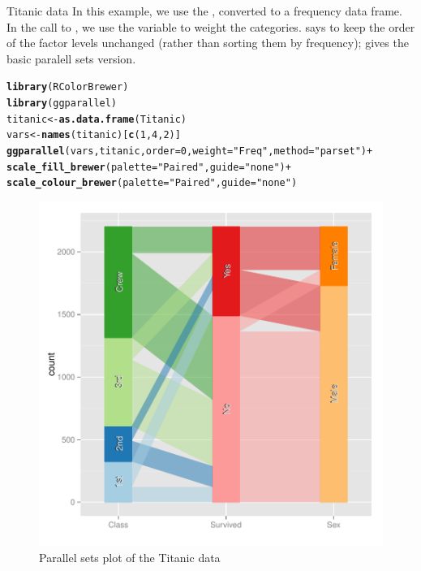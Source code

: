 \documentclass[11pt]{book}\usepackage[]{graphicx}\usepackage[]{color}
\makeatletter
\newcommand{\hlnum}[1]{\textcolor[rgb]{0.686,0.059,0.569}{#1}}%
\newcommand{\hlstr}[1]{\textcolor[rgb]{0.192,0.494,0.8}{#1}}%
\newcommand{\hlopt}[1]{\textcolor[rgb]{0,0,0}{#1}}%
\newcommand{\hlstd}[1]{\textcolor[rgb]{0.345,0.345,0.345}{#1}}%
\newcommand{\hlkwb}[1]{\textcolor[rgb]{0.69,0.353,0.396}{#1}}%
\newcommand{\hlkwc}[1]{\textcolor[rgb]{0.333,0.667,0.333}{#1}}%
\newcommand{\hlkwd}[1]{\textcolor[rgb]{0.737,0.353,0.396}{\textbf{#1}}}%
\newenvironment{kframe}{%
 \def\at@end@of@kframe{}%
 \ifinner\ifhmode%
  \def\at@end@of@kframe{\end{minipage}}%
  \begin{minipage}{\columnwidth}%
 \fi\fi%
 \def\FrameCommand##1{\hskip\@totalleftmargin \hskip-\fboxsep
 \colorbox{shadecolor}{##1}\hskip-\fboxsep
     \hskip-\linewidth \hskip-\@totalleftmargin \hskip\columnwidth}%
 \MakeFramed {\advance\hsize-\width
   \@totalleftmargin\z@ \linewidth\hsize
   \@setminipage}}%
 {\par\unskip\endMakeFramed%
 \at@end@of@kframe}
\newenvironment{knitrout}{}{} %
\renewenvironment{knitrout}{\small\renewcommand{\baselinestretch}{.85}}{} %
\makeatother
\begin{document}
\begin{Example}{Titanic data}
In this example, we use the , converted to a frequency data frame.
In the call to , we use the  variable to weight
the categories.   says to keep the order of the factor levels 
unchanged (rather than sorting them by frequency);  gives the 
basic paralell sets version.

\begin{knitrout}
\color{fgcolor}\begin{kframe}
\begin{alltt}
\hlkwd{library}\hlstd{(RColorBrewer)}
\hlkwd{library}\hlstd{(ggparallel)}
\hlstd{titanic} \hlkwb{<-} \hlkwd{as.data.frame}\hlstd{(Titanic)}
\hlstd{vars} \hlkwb{<-} \hlkwd{names}\hlstd{(titanic)[}\hlkwd{c}\hlstd{(}\hlnum{1}\hlstd{,} \hlnum{4}\hlstd{,} \hlnum{2}\hlstd{)]}
\hlkwd{ggparallel}\hlstd{(vars, titanic,} \hlkwc{order}\hlstd{=}\hlnum{0}\hlstd{,} \hlkwc{weight}\hlstd{=}\hlstr{"Freq"}\hlstd{,} \hlkwc{method}\hlstd{=}\hlstr{"parset"}\hlstd{)} \hlopt{+}
  \hlkwd{scale_fill_brewer}\hlstd{(}\hlkwc{palette}\hlstd{=}\hlstr{"Paired"}\hlstd{,} \hlkwc{guide}\hlstd{=}\hlstr{"none"}\hlstd{)} \hlopt{+}
  \hlkwd{scale_colour_brewer}\hlstd{(}\hlkwc{palette}\hlstd{=}\hlstr{"Paired"}\hlstd{,} \hlkwc{guide}\hlstd{=}\hlstr{"none"}\hlstd{)}
\end{alltt}
\end{kframe}\begin{figure}[htbp]


\centerline{\includegraphics[width=.6\textwidth]{ch05/fig/titanic-par1} }

\caption[Parallel sets plot of the Titanic data]{Parallel sets plot of the Titanic data\label{fig:titanic-par1}}
\end{figure}



\end{knitrout}
\end{Example}
\end{document}

